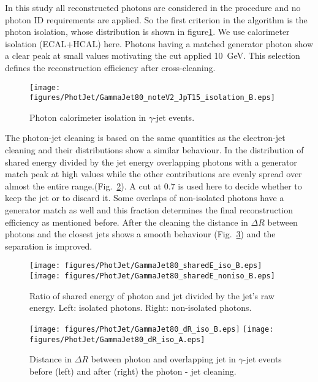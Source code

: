 \documentclass{cmspaper}
\begin{document}
In this study all reconstructed photons are considered in the procedure and no
photon ID requirements are applied. So the first criterion in the algorithm is
the photon isolation, whose distribution is shown in figure\ref{fig:pjPhotIso}. We use
calorimeter isolation (ECAL+HCAL) here. Photons having a matched generator
photon show a clear peak at small values motivating the cut applied 10\ GeV. This
selection defines the reconstruction efficiency after cross-cleaning.
\begin{figure}[hbtp]
  \begin{center}
    \texttt{[image: figures/PhotJet/GammaJet80\_noteV2\_JpT15\_isolation\_B.eps]}
    \caption{Photon calorimeter isolation in $\gamma$-jet events.}
    \label{fig:pjPhotIso}
  \end{center}
\end{figure}

The photon-jet cleaning is based on the same quantities as the electron-jet
cleaning and their distributions show a similar behaviour. In the distribution
of shared energy divided by the jet energy overlapping photons with a generator
match peak at high values while the other contributions are evenly spread over
almost the entire range.(Fig.~\ref{fig:pjSharedE}). A cut at $0.7$ is used
here to decide whether to keep the jet or to discard it. Some overlaps of
non-isolated photons have a generator match as well and this fraction
determines the final reconstruction efficiency as mentioned before. After the
cleaning the distance in $\Delta R$ between photons and the closest jets shows
a smooth behaviour (Fig.~\ref{fig:pjDeltaR}) and the separation is improved. 
\begin{figure}[hbtp]
  \begin{center}
    \texttt{[image: figures/PhotJet/GammaJet80\_sharedE\_iso\_B.eps]}
    \texttt{[image: figures/PhotJet/GammaJet80\_sharedE\_noniso\_B.eps]}
    \caption{Ratio of shared energy of photon and jet divided by the jet's raw
    energy. Left: isolated photons. Right: non-isolated photons.}
    \label{fig:pjSharedE}
  \end{center}
\end{figure}
\begin{figure}[hbtp]
  \begin{center}
    \texttt{[image: figures/PhotJet/GammaJet80\_dR\_iso\_B.eps]}
    \texttt{[image: figures/PhotJet/GammaJet80\_dR\_iso\_A.eps]}
    \caption{Distance in $\Delta R$ between photon and overlapping jet in
    $\gamma$-jet events before (left) and after (right) the photon - jet cleaning.}
    \label{fig:pjDeltaR}
  \end{center}
\end{figure}
\end{document}
